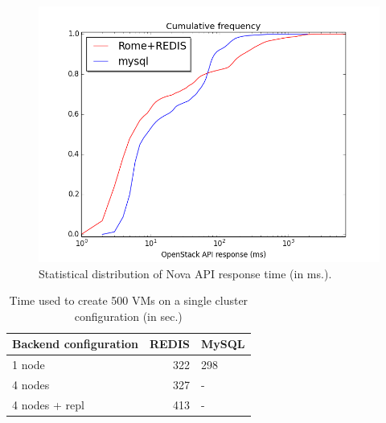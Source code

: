 

\begin{figure}[htbp]
  \centering

      \includegraphics[width=.9\linewidth]{figures/cumulative_frequency_all_mysql1_redis1.png}
        \caption{Statistical distribution of Nova API response time (in ms.).}
        \label{fig:cumulated_frequency_api}
\end{figure}



\begin{table}[htb]
\centering
\caption{\label{tab:orgtable0}Time used to create 500 VMs on a single cluster configuration (in sec.)}
\begin{tabular}{lrl}
Backend configuration & REDIS & MySQL\\
\hline
1 node & 322 & 298\\
4 nodes & 327 & -\\
4 nodes + repl & 413 & -\\
\end{tabular}
\end{table}

